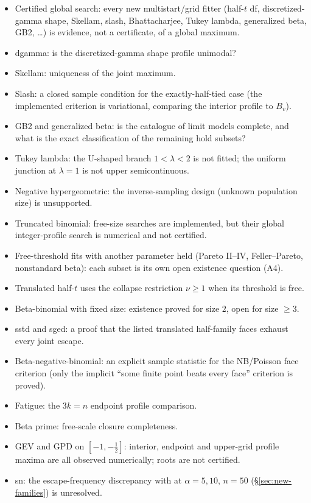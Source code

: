 \documentclass[11pt]{article}
\theoremstyle{plain}
\theoremstyle{definition}
\theoremstyle{remark}
\begin{document}
\begin{itemize}
  \item Certified global search: every new multistart/grid fitter
    (half-$t$ df, discretized-gamma shape, Skellam, slash, Bhattacharjee,
    Tukey lambda, generalized beta, GB2, \ldots) is evidence, not a
    certificate, of a global maximum.
  \item dgamma: is the discretized-gamma shape profile unimodal?
  \item Skellam: uniqueness of the joint maximum.
  \item Slash: a closed sample condition for the exactly-half-tied case
    (the implemented criterion is variational, comparing the interior
    profile to $B_v$).
  \item GB2 and generalized beta: is the catalogue of limit models
    complete, and what is the exact classification of the remaining hold
    subsets?
  \item Tukey lambda: the U-shaped branch $1<\lambda<2$ is not fitted; the
    uniform junction at $\lambda=1$ is not upper semicontinuous.
  \item Negative hypergeometric: the inverse-sampling design (unknown
    population size) is unsupported.
  \item Truncated binomial: free-size searches are implemented, but their
    global integer-profile search is numerical and not certified.
  \item Free-threshold fits with another parameter held (Pareto II--IV,
    Feller--Pareto, nonstandard beta): each subset is its own open
    existence question (A4).
  \item Translated half-$t$ uses the collapse restriction $\nu\ge1$
    when its threshold is free.
  \item Beta-binomial with fixed size: existence proved for size $2$, open
    for size $\ge3$.
  \item sstd and sged: a proof that the listed
    translated half-family faces exhaust every joint escape.
  \item Beta-negative-binomial: an explicit sample statistic for the
    NB/Poisson face criterion (only the implicit ``some finite point beats
    every face'' criterion is proved).
  \item Fatigue: the $3k=n$ endpoint profile comparison.
  \item Beta prime: free-scale closure completeness.
  \item GEV and GPD on $[-1,-\tfrac12]$: interior, endpoint and
    upper-grid profile maxima are all observed numerically; roots are not
    certified.
  \item sn: the escape-frequency discrepancy with
    \cite{azzalini1985,sartori2006} at $\alpha=5,10$, $n=50$
    (\S\ref{sec:new-families}) is unresolved.
\end{itemize}
\end{document}
